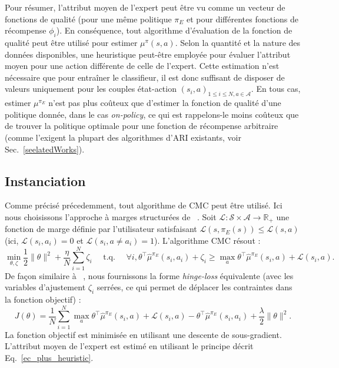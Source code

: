 \documentclass[french,utf8]{./hermes-journal}
\newcommand{\s}{\mathcal{S}}
\newcommand{\A}{\mathcal{A}}
\newcommand{\lc}{\mathcal{L}}
\begin{document}
Pour résumer, l'attribut moyen de l'expert peut être vu comme un vecteur de fonctions de qualité (pour une même politique  $\pi_E$ et pour différentes fonctions de récompense $\phi_i$). En conséquence, tout algorithme d'évaluation de la fonction de qualité peut être utilisé pour estimer $\mu^\pi(s,a)$.
Selon la quantité et la nature des données disponibles, une heuristique peut-être employée pour évaluer l'attribut moyen pour une action différente de celle de l'expert. Cette estimation n'est nécessaire que pour entraîner le classifieur, il est donc suffisant de disposer de valeurs uniquement pour les couples état-action $(s_i,a)_{1\leq i \leq N,a\in \A}$.
En tous cas, estimer  $\mu^{\pi_E}$ n'est pas plus coûteux que d'estimer la fonction de qualité d'une politique donnée, dans le cas \emph{on-policy}, ce qui est rappelons-le moins coûteux que de trouver la politique optimale pour une fonction de récompense arbitraire (comme l'exigent la plupart des algorithmes d'ARI existants, voir Sec.~\ref{seelatedWorks}).


\subsection{Instanciation}
\label{subseracticalApproacnstantiation}

Comme précisé précedemment, tout algorithme de CMC peut être utilisé. Ici nous choisissons l'approche à marges structurées de ~\cite{Taska005}. Soit
$\lc:\s\times\A\rightarrow\mathbb{R}_+$ une fonction de marge définie par l'utilisateur satisfaisant $\lc(s,\pi_E(s))\leq \lc(s,a)$ (ici,
$\lc(s_i,a_i)=0$ et $\lc(s_i,a\neq a_i)=1$). L'algorithme CMC résout :%
\begin{equation}
  \min_{\theta,\zeta}\frac{1}{2}\|\theta\|^2 +
  \frac{\eta}{N}\sum_{i=1}^N \zeta_i \text{~~~~t.q.~~~~} \forall i,
  \theta^\top\hat{\mu}^{\pi_E}(s_i,a_i)+\zeta_i \geq \max_a \theta^\top
  \hat{\mu}^{\pi_E}(s_i,a) + \lc(s_i,a). \label{ep_taskar}
\end{equation}
De façon similaire à ~\cite{Ratlif006}, nous fournissons la forme \emph{hinge-loss} équivalente (avec les variables d'ajustement $\zeta_i$ serrées, ce qui permet de déplacer les contraintes dans la fonction objectif) :
\begin{equation}
  J(\theta) = \frac{1}{N}\sum_{i=1}^N \max_a \theta^\top
  \hat{\mu}^{\pi_E}(s_i,a) + \lc(s_i,a) -
  \theta^\top\hat{\mu}^{\pi_E}(s_i,a_i) +
  \frac{\lambda}{2}\|\theta\|^2.
\end{equation}
La fonction objectif est minimisée en utilisant une descente de sous-gradient. L'attribut moyen de l'expert est estimé en utilisant le principe décrit Eq.~\eqref{ec_plus_heuristic}.
\end{document}
